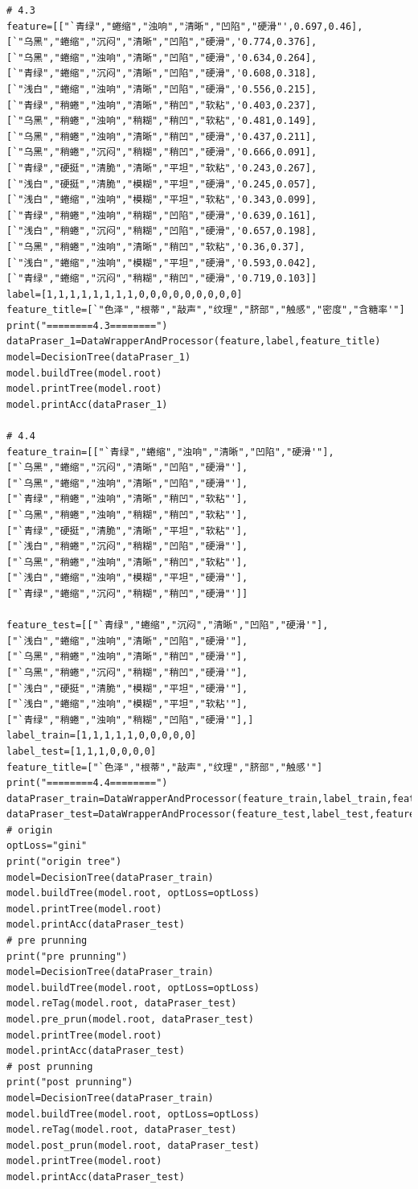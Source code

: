 \documentclass{ctexart}
\begin{document}
\begin{lstlisting}
# 4.3
feature=[["`青绿","蜷缩","浊响","清晰","凹陷","硬滑"',0.697,0.46],
[`"乌黑","蜷缩","沉闷","清晰","凹陷","硬滑",'0.774,0.376],
[`"乌黑","蜷缩","浊响","清晰","凹陷","硬滑",'0.634,0.264],
[`"青绿","蜷缩","沉闷","清晰","凹陷","硬滑",'0.608,0.318],
[`"浅白","蜷缩","浊响","清晰","凹陷","硬滑",'0.556,0.215],
[`"青绿","稍蜷","浊响","清晰","稍凹","软粘",'0.403,0.237],
[`"乌黑","稍蜷","浊响","稍糊","稍凹","软粘",'0.481,0.149],
[`"乌黑","稍蜷","浊响","清晰","稍凹","硬滑",'0.437,0.211],
[`"乌黑","稍蜷","沉闷","稍糊","稍凹","硬滑",'0.666,0.091],
[`"青绿","硬挺","清脆","清晰","平坦","软粘",'0.243,0.267],
[`"浅白","硬挺","清脆","模糊","平坦","硬滑",'0.245,0.057],
[`"浅白","蜷缩","浊响","模糊","平坦","软粘",'0.343,0.099],
[`"青绿","稍蜷","浊响","稍糊","凹陷","硬滑",'0.639,0.161],
[`"浅白","稍蜷","沉闷","稍糊","凹陷","硬滑",'0.657,0.198],
[`"乌黑","稍蜷","浊响","清晰","稍凹","软粘",'0.36,0.37],
[`"浅白","蜷缩","浊响","模糊","平坦","硬滑",'0.593,0.042],
[`"青绿","蜷缩","沉闷","稍糊","稍凹","硬滑",'0.719,0.103]]
label=[1,1,1,1,1,1,1,1,0,0,0,0,0,0,0,0,0]
feature_title=[`"色泽","根蒂","敲声","纹理","脐部","触感","密度","含糖率'"]
print("========4.3========")
dataPraser_1=DataWrapperAndProcessor(feature,label,feature_title)
model=DecisionTree(dataPraser_1)
model.buildTree(model.root)
model.printTree(model.root)
model.printAcc(dataPraser_1)

# 4.4
feature_train=[["`青绿","蜷缩","浊响","清晰","凹陷","硬滑'"],
["`乌黑","蜷缩","沉闷","清晰","凹陷","硬滑"'],
["`乌黑","蜷缩","浊响","清晰","凹陷","硬滑"'],
["`青绿","稍蜷","浊响","清晰","稍凹","软粘"'],
["`乌黑","稍蜷","浊响","稍糊","稍凹","软粘"'],
["`青绿","硬挺","清脆","清晰","平坦","软粘"'],
["`浅白","稍蜷","沉闷","稍糊","凹陷","硬滑"'],
["`乌黑","稍蜷","浊响","清晰","稍凹","软粘"'],
["`浅白","蜷缩","浊响","模糊","平坦","硬滑"'],
["`青绿","蜷缩","沉闷","稍糊","稍凹","硬滑"']]

feature_test=[["`青绿","蜷缩","沉闷","清晰","凹陷","硬滑'"],
["`浅白","蜷缩","浊响","清晰","凹陷","硬滑'"],
["`乌黑","稍蜷","浊响","清晰","稍凹","硬滑'"],
["`乌黑","稍蜷","沉闷","稍糊","稍凹","硬滑'"],
["`浅白","硬挺","清脆","模糊","平坦","硬滑'"],
["`浅白","蜷缩","浊响","模糊","平坦","软粘'"],
["`青绿","稍蜷","浊响","稍糊","凹陷","硬滑'"],]
label_train=[1,1,1,1,1,0,0,0,0,0]
label_test=[1,1,1,0,0,0,0]
feature_title=["`色泽","根蒂","敲声","纹理","脐部","触感'"]
print("========4.4========")
dataPraser_train=DataWrapperAndProcessor(feature_train,label_train,feature_title)
dataPraser_test=DataWrapperAndProcessor(feature_test,label_test,feature_title)
# origin
optLoss="gini"
print("origin tree")
model=DecisionTree(dataPraser_train)
model.buildTree(model.root, optLoss=optLoss)
model.printTree(model.root)
model.printAcc(dataPraser_test)
# pre prunning
print("pre prunning")
model=DecisionTree(dataPraser_train)
model.buildTree(model.root, optLoss=optLoss)
model.reTag(model.root, dataPraser_test)
model.pre_prun(model.root, dataPraser_test)
model.printTree(model.root)
model.printAcc(dataPraser_test)
# post prunning
print("post prunning")
model=DecisionTree(dataPraser_train)
model.buildTree(model.root, optLoss=optLoss)
model.reTag(model.root, dataPraser_test)
model.post_prun(model.root, dataPraser_test)
model.printTree(model.root)
model.printAcc(dataPraser_test)
\end{lstlisting}
\end{document}
